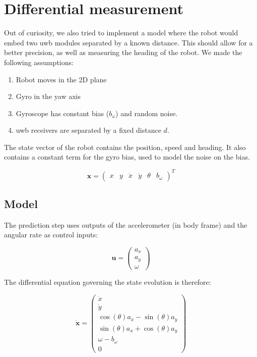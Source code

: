 \documentclass[a4paper, 12pt]{scrreprt}
\begin{document}
\section{Differential measurement}

Out of curiosity, we also tried to implement a model where the robot would embed two \gls{uwb} modules separated by a known distance.
This should allow for a better precision, as well as measuring the heading of the robot.
We made the following assumptions:

\begin{enumerate}
    \item Robot moves in the 2D plane
    \item Gyro in the yaw axis
    \item  Gyroscope has constant bias ($b_\omega$) and random noise.
    \item \gls{uwb} receivers are separated by a fixed distance $d$.
\end{enumerate}

The state vector of the robot contains the position, speed and heading.
It also contains a constant term for the gyro bias, used to model the noise on the bias.


\begin{equation}
\mathbf{x} = \begin{pmatrix} x & y & \dot{x} & \dot{y} & \theta & b_{\omega} \end{pmatrix}^T
\end{equation}

\subsection{Model}

The prediction step uses outputs of the accelerometer (in body frame) and the angular rate as control inputs:

\begin{equation}
\mathbf{u} = \begin{pmatrix}
    a_x\\
    a_y\\
    \omega
\end{pmatrix}
\end{equation}

The differential equation governing the state evolution is therefore:

\begin{equation}
\mathbf{\dot{x}} = \begin{pmatrix}
\dot{x}\\
\dot{y}\\
\cos(\theta) a_x - \sin(\theta) a_y \\
\sin(\theta) a_x + \cos(\theta) a_y \\
\omega - b_{\omega}\\
0
\end{pmatrix}
\end{equation}
\end{document}
